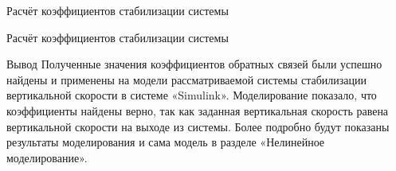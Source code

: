 \begin{frame}{Расчёт коэффициентов стабилизации системы}
    \begin{minipage}[c]{0.45\textwidth}
    \end{minipage}
    \begin{minipage}[c]{0.45\textwidth}
    \end{minipage}
\end{frame}

\begin{frame}{Расчёт коэффициентов стабилизации системы}
    \begin{block}{Вывод}
        Полученные значения коэффициентов обратных связей были успешно найдены и применены на модели рассматриваемой 
        системы стабилизации вертикальной скорости в системе «Simulink». Моделирование показало, что коэффициенты найдены верно, 
        так как заданная вертикальная скорость равена вертикальной скорости на выходе из системы. 
        Более подробно будут показаны результаты моделирования и сама модель в разделе «Нелинейное моделирование».
    \end{block}
\end{frame}

